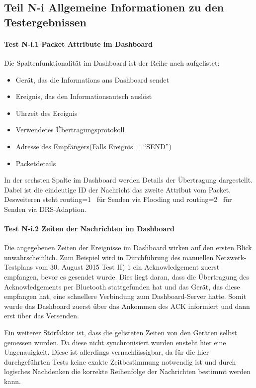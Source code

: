 \subsection{Teil N-i Allgemeine Informationen zu den Testergebnissen}

\paragraph{Test N-i.1 Packet Attribute im Dashboard}

Die Spaltenfunktionalität im Dashboard ist der Reihe nach aufgelistet:

\begin{itemize}
  \item Gerät, das die Informations ans Dashboard sendet
  \item Ereignis, das den Informationsautsch auslöst
  \item Uhrzeit des Ereignis
  \item Verwendetes Übertragungsprotokoll
  \item Adresse des Empfängers(Falls Ereignis = ``SEND'')
  \item Packetdetails
\end{itemize}

In der sechsten Spalte im Dashboard werden Details der Übertragung dargestellt. Dabei ist die eindeutige ID der Nachricht das zweite Attribut vom Packet. Desweiteren steht \glqq routing=1\grqq~ für Senden via Flooding und \glqq routing=2\grqq~ für Senden via DRS-Adaption.

\paragraph{Test N-i.2 Zeiten der Nachrichten im Dashboard}

Die angegebenen Zeiten der Ereignisse im Dashboard wirken auf den ersten Blick unwahrscheinlich. Zum Beispiel wird in Durchführung des manuellen Netzwerk-Testplans vom 30. August 2015 Test II) 1 ein Acknowledgement zuerst empfangen, bevor es gesendet wurde. Dies liegt daran, dass die Übertragung des Acknowledgements per Bluetooth stattgefunden hat und das Gerät, das diese empfangen hat, eine schnellere Verbindung zum Dashboard-Server hatte. Somit wurde das Dashboard zuerst über das Ankommen des ACK informiert und dann erst über das Versenden.

Ein weiterer Störfaktor ist, dass die gelisteten Zeiten von den Geräten selbst gemessen wurden. Da diese nicht synchronisiert wurden ensteht hier eine Ungenauigkeit. Diese ist allerdings vernachlässigbar, da für die hier durchgeführten Tests keine exakte Zeitbestimmung notwendig ist und durch logisches Nachdenken die korrekte Reihenfolge der Nachrichten bestimmt werden kann.

